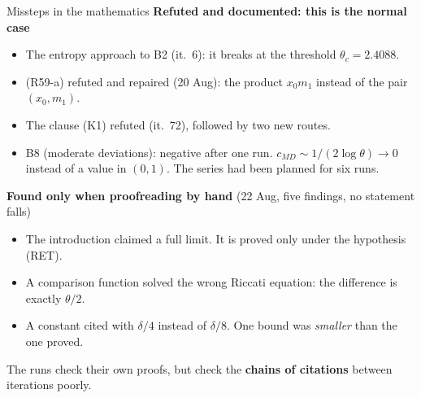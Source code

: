 \documentclass[11pt,aspectratio=169]{beamer}
\begin{document}
\begin{frame}{Missteps in the mathematics}
  \small
  \textbf{Refuted and documented: this is the normal case}
  \begin{itemize}
  \item The entropy approach to B2 (it.~6): it breaks at the threshold $\theta_c=2.4088$.
  \item (R59-a) refuted and repaired (20 Aug): the product $x_0m_1$ instead of the pair
    $(x_0,m_1)$.
  \item The clause (K1) refuted (it.~72), followed by two new routes.
  \item B8 (moderate deviations): negative after one run.
    $c_{MD}\sim1/(2\log\theta)\to0$ instead of a value in $(0,1)$. The series had been
    planned for six runs.
  \end{itemize}
  \textbf{Found only when proofreading by hand} (22 Aug, five findings, no statement falls)
  \begin{itemize}
  \item The introduction claimed a full limit. It is proved only under the hypothesis
    (RET).
  \item A comparison function solved the wrong Riccati equation: the difference is exactly
    $\theta/2$.
  \item A constant cited with $\delta/4$ instead of $\delta/8$. One bound was
    \emph{smaller} than the one proved.
  \end{itemize}
  The runs check their own proofs, but check the \textbf{chains of citations} between
  iterations poorly.
\end{frame}
\end{document}
